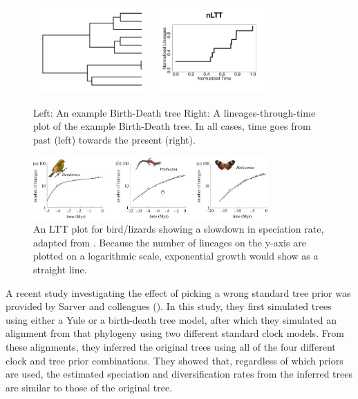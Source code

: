 \begin{figure}[H]
  \includegraphics[width=0.4\textwidth]{bd_tree.png}
  \includegraphics[width=0.4\textwidth]{bd_tree_nltt.png}
  \caption{
    Left: An example Birth-Death tree
    Right: A lineages-through-time plot of the example Birth-Death tree.
    In all cases, time goes from past (left) towards the present (right).
  }
  \label{fig:bd}
\end{figure}

\begin{figure}[H]
  \includegraphics[width=0.8\textwidth]{etienne_et_al_2012_dd_1.png}
  \caption{
    An LTT plot for bird/lizards showing a slowdown in speciation
    rate, adapted from \cite{etienne2012diversity}. Because the number
    of lineages on the y-axis are plotted on a logarithmic scale,
    exponential growth would show as a straight line. 
  }
  \label{fig:bd}
\end{figure}

A recent study investigating the effect of picking
a wrong standard tree prior was provided by Sarver and 
colleagues (\cite{sarver2019choice}).
In this study, they first simulated trees using either a Yule or a birth-death
tree model, after which they simulated an alignment from that phylogeny
using two different standard clock models. From these alignments, 
they inferred the original trees using all of the four 
different clock and tree prior combinations. 
They showed that, regardless of which priors are used,
the estimated speciation and diversification rates 
from the inferred trees are similar to those of the original tree.

